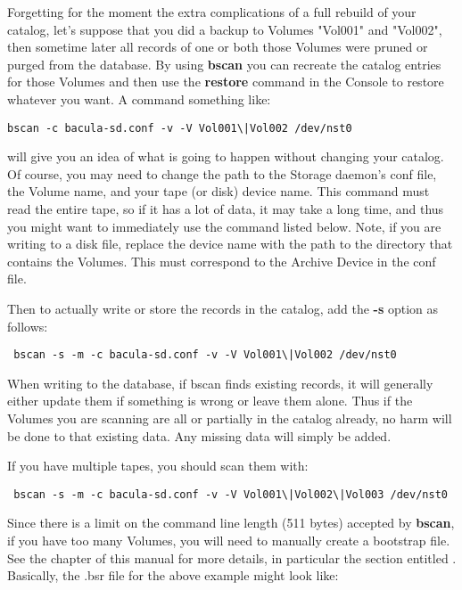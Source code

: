 Forgetting for the moment the extra complications of a full rebuild of 
your catalog, let's suppose that you did a backup to Volumes "Vol001" 
and "Vol002", then sometime later all records of one or both those
Volumes were pruned or purged from the
database. By using {\bf bscan} you can recreate the catalog entries for
those Volumes and then use the {\bf restore} command in the Console to restore
whatever you want. A command something like: 

\footnotesize
\begin{verbatim}
bscan -c bacula-sd.conf -v -V Vol001\|Vol002 /dev/nst0
\end{verbatim}
\normalsize

will give you an idea of what is going to happen without changing
your catalog. Of course, you may need to change the path to the Storage
daemon's conf file, the Volume name, and your tape (or disk) device name. This
command must read the entire tape, so if it has a lot of data, it may take a
long time, and thus you might want to immediately use the command listed
below. Note, if you are writing to a disk file, replace the device name with
the path to the directory that contains the Volumes. This must correspond to
the Archive Device in the conf file. 

Then to actually write or store the records in the catalog, add the {\bf -s}
option as follows: 

\footnotesize
\begin{verbatim}
 bscan -s -m -c bacula-sd.conf -v -V Vol001\|Vol002 /dev/nst0
\end{verbatim}
\normalsize

When writing to the database, if bscan finds existing records, it will
generally either update them if something is wrong or leave them alone. Thus
if the Volumes you are scanning are all or partially in the catalog already, no
harm will be done to that existing data. Any missing data will simply be
added. 

If you have multiple tapes, you should scan them with: 

\footnotesize
\begin{verbatim}
 bscan -s -m -c bacula-sd.conf -v -V Vol001\|Vol002\|Vol003 /dev/nst0
\end{verbatim}
\normalsize

Since there is a limit on the command line length (511 bytes) accepted
by {\bf bscan}, if you have too many Volumes, you will need to manually
create a bootstrap file.  See the 
chapter of this manual for more details, in particular the section
entitled . Basically, the
.bsr file for the above example might look like:

